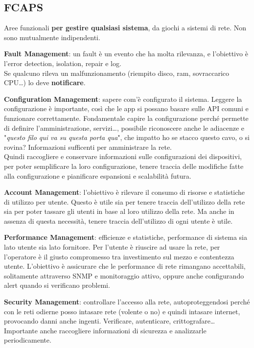 \documentclass[10pt]{book}
\begin{document}
\subsection{FCAPS}
Aree funzionali \textbf{per gestire qualsiasi sistema}, da giochi a sistemi di rete. Non sono mutualmente indipendenti.
\begin{list}{}{}
	\item \textbf{Fault Management}: un fault è un evento che ha molta rilevanza, e l'obiettivo è l'error detection, isolation, repair e log.\\
	Se qualcuno rileva un malfunzionamento (riempito disco, ram, sovraccarico CPU\ldots) lo deve \textbf{notificare}.
	\item \textbf{Configuration Management}: sapere com'è configurato il sistema. Leggere la configurazione è importante, così che le app si possano basare sulle API comuni e funzionare correttamente. Fondamentale capire la configurazione perché permette di definire l'amministrazione, servizi\ldots, possibile riconoscere anche le adiacenze e "\textit{questo filo qui va su questa porta qua}", che impatto ho se stacco questo cavo, o si rovina? Informazioni sufficenti per amministrare la rete.\\
	Quindi raccogliere e conservare informazioni sulle configurazioni dei dispositivi, per poter semplificare la loro configurazione, tenere traccia delle modifiche fatte alla configurazione e pianificare espansioni e scalabilità futura.
	\item \textbf{Account Management}: l'obiettivo è rilevare il consumo di risorse e statistiche di utilizzo per utente. Questo è utile sia per tenere traccia dell'utilizzo della rete sia per poter tassare gli utenti in base al loro utilizzo della rete. Ma anche in assenza di questa necessità, tenere traccia dell'utilizzo di ogni utente è utile.
	\item \textbf{Performance Management}: efficienze e statistiche, performance di sistema sia lato utente sia lato fornitore. Per l'utente è riuscire ad usare la rete, per l'operatore è il giusto compromesso tra investimento sul mezzo e contentezza utente. L'obiettivo è assicurare che le performance di rete rimangano accettabili, solitamente attraverso SNMP e monitoraggio attivo, oppure anche configurando alert quando si verificano problemi.
	\item \textbf{Security Management}: controllare l'accesso alla rete, autoproteggendosi perché con le reti odierne posso intasare rete (volente o no) e quindi intasare internet, provocando danni anche ingenti. Verificare, autenticare, crittografare\ldots\\
	Importante anche raccogliere informazioni di sicurezza e analizzarle periodicamente.
\end{list}
\end{document}
